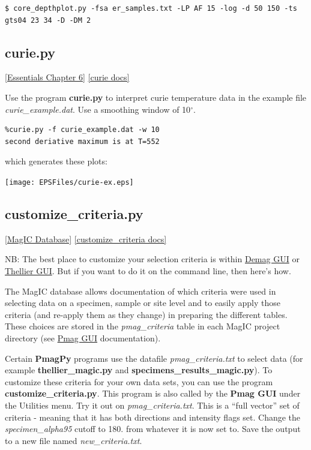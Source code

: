 \documentclass[11pt]{book}
\begin{document}
{{{\begin{verbatim}
$ core_depthplot.py -fsa er_samples.txt -LP AF 15 -log -d 50 150 -ts gts04 23 34 -D -DM 2
\end{verbatim}


\subsection{curie.py}
\href{http://earthref.org/MAGIC/books/Tauxe/Essentials/WebBook3ch6.html#ch6}{[Essentials Chapter 6]}
\href{https://github.com/PmagPy/PmagPy/blob/master/programs/curie.py}{[curie docs]}

Use the program {\bf curie.py} to interpret curie temperature data in the example file {\it curie\_example.dat}.  Use a smoothing window of 10$^{\circ}$.



\begin{verbatim}
%curie.py -f curie_example.dat -w 10
second deriative maximum is at T=552
\end{verbatim}

\noindent which generates these plots:

{%
  \texttt{[image: EPSFiles/curie-ex.eps]}}




\subsection{customize\_criteria.py}
\href{#MagICDatabase}{[MagIC Database]}
\href{https://github.com/PmagPy/PmagPy/blob/master/programs/customize_criteria.py}{[customize\_criteria docs]}

NB:  The best place to customize your selection criteria is within \href{#demag_gui.py}{Demag GUI} or \href{#thellier_gui.py}{Thellier GUI}.  But if you want to do it on the command line, then here's how.

The MagIC database allows documentation of which criteria were used in selecting data on a specimen, sample or site level and to easily apply those criteria (and re-apply them as they change) in preparing the different tables.  These choices are stored in the {\it pmag\_criteria} table in each MagIC project directory (see \href{#pmag_gui.py}{Pmag GUI} documentation).

 Certain {\bf PmagPy} programs use the datafile {\it pmag\_criteria.txt} to select data (for example {\bf thellier\_magic.py} and {\bf specimens\_results\_magic.py}).  To customize these criteria for your own data sets, you can use the program {\bf customize\_criteria.py}.  This program is also called by the {\bf Pmag GUI} under the Utilities menu.    Try it out on {\it pmag\_criteria.txt}.   This is a ``full vector'' set of criteria - meaning that it has both directions and intensity flags set.  Change the {\it specimen\_alpha95} cutoff to 180. from whatever it is now set to.   Save the output to a new file named {\it new\_criteria.txt}.

}}}
\end{document}
